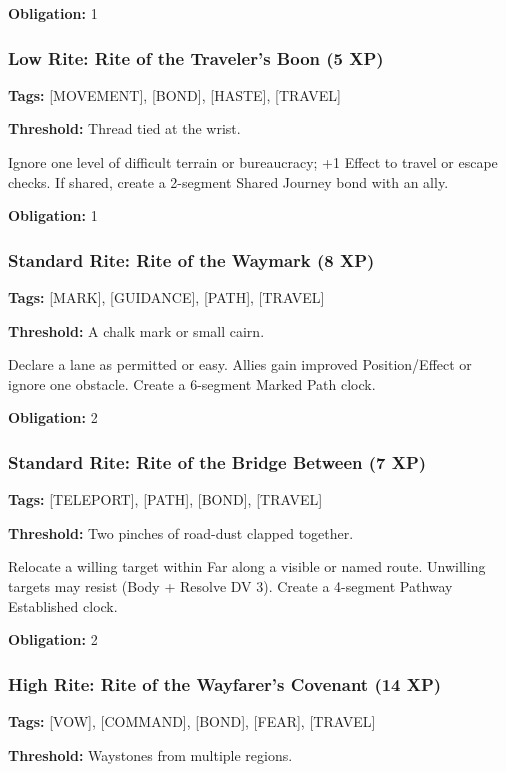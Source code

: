 \textbf{Obligation:} 1

\subsubsection{Low Rite: Rite of the Traveler's Boon (5 XP)}

\textbf{Tags:} [MOVEMENT], [BOND], [HASTE], [TRAVEL]

\textbf{Threshold:} Thread tied at the wrist.

Ignore one level of difficult terrain or bureaucracy; +1 Effect to travel or escape checks. If shared, create a 2-segment Shared Journey bond with an ally.

\textbf{Obligation:} 1

\subsubsection{Standard Rite: Rite of the Waymark (8 XP)}

\textbf{Tags:} [MARK], [GUIDANCE], [PATH], [TRAVEL]

\textbf{Threshold:} A chalk mark or small cairn.

Declare a lane as permitted or easy. Allies gain improved Position/Effect or ignore one obstacle. Create a 6-segment Marked Path clock.

\textbf{Obligation:} 2

\subsubsection{Standard Rite: Rite of the Bridge Between (7 XP)}

\textbf{Tags:} [TELEPORT], [PATH], [BOND], [TRAVEL]

\textbf{Threshold:} Two pinches of road-dust clapped together.

Relocate a willing target within Far along a visible or named route. Unwilling targets may resist (Body + Resolve DV 3). Create a 4-segment Pathway Established clock.

\textbf{Obligation:} 2

\subsubsection{High Rite: Rite of the Wayfarer's Covenant (14 XP)}

\textbf{Tags:} [VOW], [COMMAND], [BOND], [FEAR], [TRAVEL]

\textbf{Threshold:} Waystones from multiple regions.

